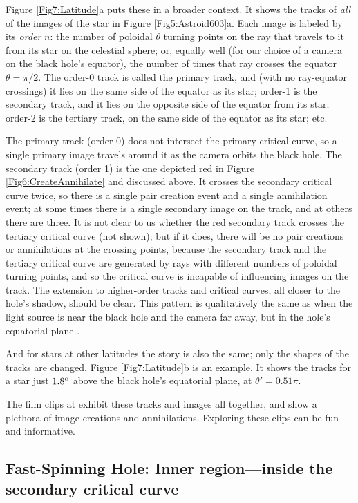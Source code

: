 \documentclass[12pt]{iopart}
\begin{document}
Figure \ref{Fig7:Latitude}a puts these in a broader context. It shows the 
tracks of \emph{all} of the images of the star in Figure \ref{Fig5:Astroid603}a.  
Each image is labeled by its \emph{order} $n$: the number of poloidal $\theta$ turning points on the ray that travels to it from its star on the celestial sphere; or,
equally well (for our choice of a camera on the black hole's equator), the number of times that ray crosses 
the  equator $\theta=\pi/2$.  The order-0 track is called the primary track, and (with no ray-equator crossings) it lies on the same side of the equator as its star;
order-1 is the secondary track, and it lies on the opposite side of the equator from its star; order-2 is the tertiary track, on the same side of the equator as its star; etc.  

The primary track (order 0) does not intersect the primary critical curve, so a 
single primary image travels around it as the camera orbits the black hole.
The secondary track (order 1) is the one depicted red in 
Figure \ref{Fig6:CreateAnnihilate} and discussed above.  It crosses the secondary
critical curve twice, so there is a single pair creation event and a
single annihilation event; at some times there is a single secondary image on the track,
and at others there are three.  It is not clear to us whether the red secondary
track crosses the tertiary critical curve (not shown); but if it does, there will
be no pair creations or annihilations at the crossing points, because the
secondary track and the tertiary critical curve are generated by rays with different numbers of 
poloidal turning points, and so the  critical curve is incapable of 
influencing images on the track.  The extension to higher-order
tracks and critical curves, all closer to the hole's shadow, should be clear.
This pattern is qualitatively the same as when the light source is near the black hole and the camera far away, but in the hole's equatorial plane \cite{Bozza10}. 

And for stars at other latitudes the story is also the same; only the shapes of the
tracks are changed.  Figure \ref{Fig7:Latitude}b is an example. It shows
the tracks for a star just $1.8^{\rm o}$ above the black hole's equatorial
plane, at $\theta'=0.51\pi$.  

The film clips at \cite{DnegSite} exhibit these tracks and images all together, and show a plethora of image creations and annihilations.   Exploring these clips can be fun and informative.

\subsection{Fast-Spinning Hole:  Inner region---inside the secondary critical curve}
\label{subsec:Fingerprint}
\end{document}
